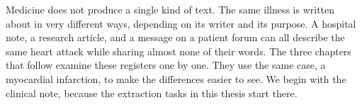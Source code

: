 
Medicine does not produce a single kind of text. The same illness is written
about in very different ways, depending on its writer and its purpose. A hospital
note, a research article, and a message on
a patient forum can all describe the same heart attack while sharing almost none
of their words. The three chapters that follow examine these
registers one by one. They use the same case, a myocardial infarction, to make
the differences easier to see. We begin with the clinical note, because the
extraction tasks in this thesis start there.






